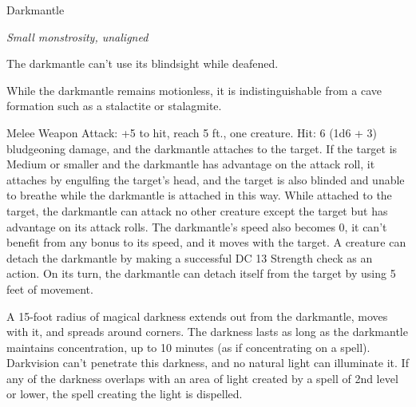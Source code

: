 \begin{monsterbox}{Darkmantle}
\begin{hangingpar}
\textit{Small monstrosity, unaligned}
\end{hangingpar}
\dndline%
\basics[%
armorclass = 11,
hitpoints = 5d6 + 5,
speed = {10 ft., fly 30 ft.}
]
\dndline%
\stats[%
STR = \stat{16},
DEX = \stat{12},
CON = \stat{13},
INT = \stat{2},
WIS = \stat{10},
CHA = \stat{5}
]
\dndline%
\details[%
skills={Stealth +3, },
damageimmunities={},
savingthrows={},
conditionimmunities={},
damageresistances={},
damagevulnerabilities={},
senses={blindsight 60 ft., passive Perception 10},
challenge=1/2
]
\dndline%
\begin{monsteraction}[Echolocation]
The darkmantle can't use its blindsight while deafened.
\end{monsteraction}
\begin{monsteraction}
While the darkmantle remains motionless, it is indistinguishable from a cave formation such as a stalactite or stalagmite.
\end{monsteraction}
\begin{monsteraction}[Crush]
Melee Weapon Attack: +5 to hit, reach 5 ft., one creature. Hit: 6 (1d6 + 3) bludgeoning damage, and the darkmantle attaches to the target. If the target is Medium or smaller and the darkmantle has advantage on the attack roll, it attaches by engulfing the target's head, and the target is also blinded and unable to breathe while the darkmantle is attached in this way.
While attached to the target, the darkmantle can attack no other creature except the target but has advantage on its attack rolls. The darkmantle's speed also becomes 0, it can't benefit from any bonus to its speed, and it moves with the target.
A creature can detach the darkmantle by making a successful DC 13 Strength check as an action. On its turn, the darkmantle can detach itself from the target by using 5 feet of movement.
\end{monsteraction}
\begin{monsteraction}
A 15-foot radius of magical darkness extends out from the darkmantle, moves with it, and spreads around corners. The darkness lasts as long as the darkmantle maintains concentration, up to 10 minutes (as if concentrating on a spell). Darkvision can't penetrate this darkness, and no natural light can illuminate it. If any of the darkness overlaps with an area of light created by a spell of 2nd level or lower, the spell creating the light is dispelled.
\end{monsteraction}
\end{monsterbox}